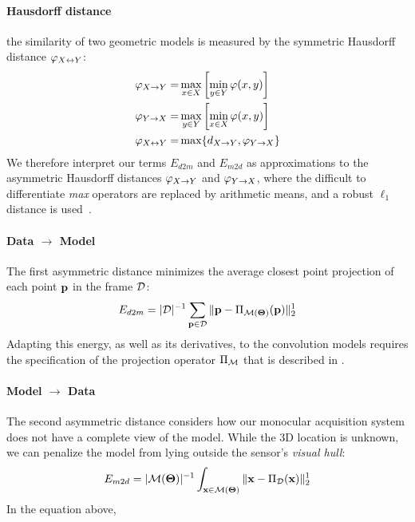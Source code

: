 \paragraph{Hausdorff distance} 
 the similarity of two geometric models is measured by the symmetric Hausdorff distance $\varphi_{X \leftrightarrow Y}$:
% 
\begin{eqnarray*}
\varphi_{X \rightarrow Y} =& \max_{x \in X} \left[ \min_{y \in Y} \varphi(x,y) \right] \\
\varphi_{Y \rightarrow X} =& \max_{y \in Y} \left[ \min_{x \in X} \varphi(x,y) \right] \\
\varphi_{X \leftrightarrow Y} =& \max \{ d_{X \rightarrow Y}, \varphi_{Y \rightarrow X} \}
\end{eqnarray*}
We therefore interpret our terms $E_{d2m}$ and $E_{m2d}$ as approximations to the asymmetric Hausdorff distances $\varphi_{X \rightarrow Y}$ and $\varphi_{Y \rightarrow X}$, where the difficult to differentiate \emph{max} operators are replaced by arithmetic means, and a robust $\ell_1$ distance is used~\cite{regcourse}.



\paragraph{Data $\rightarrow$ Model}
The first asymmetric distance minimizes the average closest point projection of each point $\mathbf{p}$ in the  frame $\mathcal{D}$:
%
\begin{equation}
E_{d2m} = |\mathcal{D}|^{-1} \sum_{\mathbf{p} \in \mathcal{D}} \| \mathbf{p} - \Pi_{\mathcal{M}(\boldsymbol{\Theta})}(\mathbf{p})\|_2^1
\label{eq:d2m}
\end{equation}
% 
Adapting this energy, as well as its derivatives, to the convolution models requires the specification of the projection operator $\Pi_{\mathcal{M}}$ that is described in .

\paragraph{Model $\rightarrow$ Data}
The second asymmetric distance considers how our monocular acquisition system does not have a complete view of the model. While the 3D location is unknown, we can penalize the model from lying outside the sensor's \emph{visual hull}:
\begin{equation}
E_{m2d} = |\mathcal{M}(\boldsymbol{\Theta})|^{-1} \int_{\mathbf{x} \in \mathcal{M}(\boldsymbol{\Theta})} \| \mathbf{x} - \Pi_{\mathcal{D}}(\mathbf{x})\|_2^1
\label{eq:m2d}
\end{equation}
In the equation above, 
